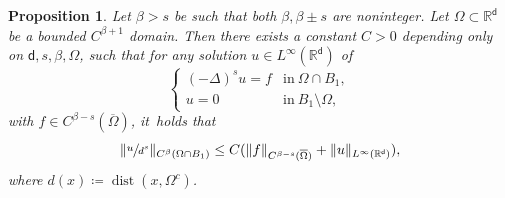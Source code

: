\documentclass[JEP,XML,SOM,Unicode,published]{cedram}
\theoremstyle{plain}
\newtheorem{prop}[thm]{Proposition}
\theoremstyle{definition}
\DeclareMathOperator{\dist}{dist}
\newcommand{\R}{{\mathbb{R}}}
\let\be\beta
\let\ol\overline
\renewcommand{\d}{\mathsf{d}}
\begin{document}
\begin{prop}\label{lem:ArO2}
Let $\be>s$ be such that both $\be, \be\pm s$ are noninteger. Let $\Omega\subset\R^\d$ be a bounded $C^{\be+1}$ domain. Then there exists a constant $C>0$ depending only on $\d,s,\be,\Omega$, such that for any solution $u\in L^\infty(\R^\d)$ of
\begin{equation}\label{eq:SchaBVP}
\begin{cases}
(-\Delta)^s u = f & \text{in} \ \Omega\cap B_1,\\
u = 0 & \text{in} \ B_1\setminus\Omega,
\end{cases}
\end{equation}
with $f\in C^{\be-s}(\ol\Omega)$, it~holds that
\begin{equation}\label{eq:ArO2}
\|\sfrac{u}{d^s}\|_{C^\be({\Omega}\cap B_1)} \le C(\|f\|_{C^{\be-s}(\ol\Omega)} + \|u\|_{L^\infty(\R^\d)}),
\end{equation}
{where $d(x)\coloneqq \dist(x,\Omega^c)$.}
\end{prop}
\end{document}
